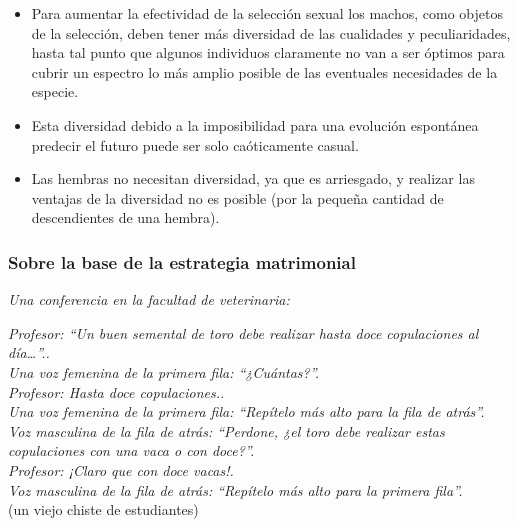 \begin{itemize}

\item
  Para aumentar la efectividad de la selección sexual los machos, como
  objetos de la selección, deben tener más diversidad de las cualidades
  y peculiaridades, hasta tal punto que algunos individuos claramente no
  van a ser óptimos para cubrir un espectro lo más amplio posible de las
  eventuales necesidades de la especie.
\item
  Esta diversidad debido a la imposibilidad para una evolución
  espontánea predecir el futuro puede ser solo caóticamente casual.
\item
  Las hembras no necesitan diversidad, ya que es arriesgado, y realizar
  las ventajas de la diversidad no es posible (por la pequeña cantidad
  de descendientes de una hembra).
\end{itemize}

\protect\hypertarget{M6}{}{}

{\subsubsection{Sobre la base de la estrategia matrimonial}
\label{sobre-la-base-de-la-estrategia-matrimonial}}

\noindent
\emph{Una conferencia en la facultad de veterinaria:\\}

\noindent \emph{%
Profesor:  ``Un buen semental de toro debe realizar hasta doce
copulaciones al día\ldots{}''..\\
Una voz femenina de la primera fila:  ``¿Cuántas?''.\\
Profesor:  Hasta doce copulaciones..\\
Una voz femenina de la primera fila:  ``Repítelo más alto para la fila
de atrás''.\\
Voz masculina de la fila de atrás:  ``Perdone, ¿el toro debe realizar
estas copulaciones con una vaca o con doce?''.\\
Profesor:  ¡Claro que con doce vacas!.\\
Voz masculina de la fila de atrás:  ``Repítelo más alto para la primera
fila''.\\}
 (un viejo chiste de estudiantes)\\



